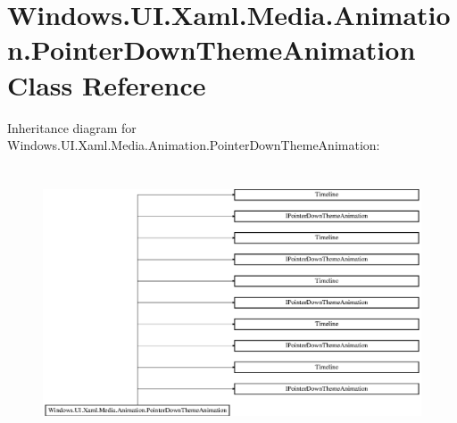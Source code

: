 \hypertarget{class_windows_1_1_u_i_1_1_xaml_1_1_media_1_1_animation_1_1_pointer_down_theme_animation}{}\section{Windows.\+U\+I.\+Xaml.\+Media.\+Animation.\+Pointer\+Down\+Theme\+Animation Class Reference}
\label{class_windows_1_1_u_i_1_1_xaml_1_1_media_1_1_animation_1_1_pointer_down_theme_animation}
Inheritance diagram for Windows.\+U\+I.\+Xaml.\+Media.\+Animation.\+Pointer\+Down\+Theme\+Animation\+:\begin{figure}[H]
\begin{center}
\leavevmode
\includegraphics[height=8.041776cm]{class_windows_1_1_u_i_1_1_xaml_1_1_media_1_1_animation_1_1_pointer_down_theme_animation}
\end{center}
\end{figure}
